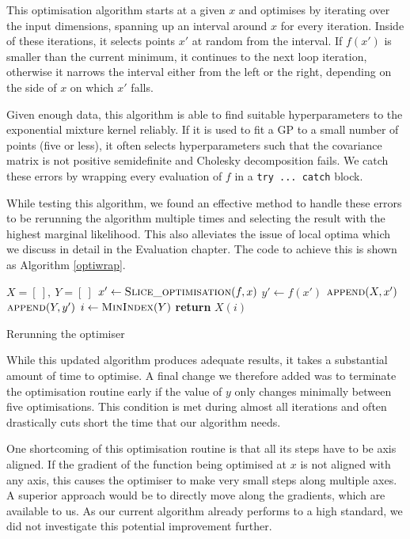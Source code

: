 \documentclass[a4paper,12pt,twoside,openright]{report}
\begin{document}
This optimisation algorithm starts at a given $x$ and optimises by iterating over the input dimensions, spanning up an interval around $x$ for every iteration. Inside of these iterations, it selects points $x'$ at random from the interval. If $f(x')$ is smaller than the current minimum, it continues to the next loop iteration, otherwise it narrows the interval either from the left or the right, depending on the side of $x$ on which $x'$ falls.

Given enough data, this algorithm is able to find suitable hyperparameters to the exponential mixture kernel reliably. If it is used to fit a GP to a small number of points (five or less), it often selects hyperparameters such that the covariance matrix is not positive semidefinite and Cholesky decomposition fails. We catch these errors by wrapping every evaluation of $f$ in a \texttt{try ... catch} block. 

While testing this algorithm, we found an effective method to handle these errors to be rerunning the algorithm multiple times and selecting the result with the highest marginal likelihood. This also alleviates the issue of local optima which we discuss in detail in the Evaluation chapter. The code to achieve this is shown as Algorithm \ref{optiwrap}.

\begin{algorithm}
\begin{algorithmic}[1]
\State $X = [\ ],\ Y = [\ ]$
\State $x'\gets \Call{Slice\_optimisation}{f, x}$
\State $y'\gets f(x')$
\State $\Call{append}{X, x'}$
\State $\Call{append}{Y, y'}$
\EndFor
\State $i\gets \Call{MinIndex}{Y}$
\State \textbf{return} $X(i)$
\EndProcedure
\end{algorithmic}
\caption{Rerunning the optimiser}
\label{optiwrap}
\end{algorithm}

While this updated algorithm produces adequate results, it takes a substantial amount of time to optimise. A final change we therefore added was to terminate the optimisation routine early if the value of $y$ only changes minimally between five optimisations. This condition is met during almost all iterations and often drastically cuts short the time that our algorithm needs.

One shortcoming of this optimisation routine is that all its steps have to be axis aligned. If the gradient of the function being optimised at $x$ is not aligned with any axis, this causes the optimiser to make very small steps along multiple axes. A superior approach would be to directly move along the gradients, which are available to us. As our current algorithm already performs to a high standard, we did not investigate this potential improvement further.
\end{document}
